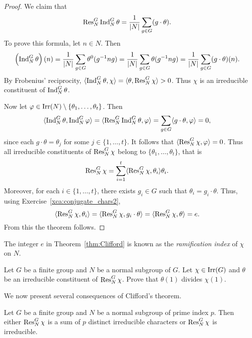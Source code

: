 \begin{proof}
    We claim that 
    \[
    \operatorname{Res}_N^G\operatorname{Ind}_N^G\theta=\frac{1}{|N|}\sum_{g\in G}(g\cdot\theta).
    \]
    To prove this formula, let $n\in N$. Then 
    \[
    \left(\operatorname{Ind}_N^G\theta\right)(n)
    =\frac{1}{|N|}\sum_{g\in G}\theta^0(g^{-1}ng)
    =\frac{1}{|N|}\sum_{g\in G}\theta(g^{-1}ng)
    =\frac{1}{|N|}\sum_{g\in G}(g\cdot\theta)(n).
    \]
    By Frobenius' reciprocity, 
    $\langle\operatorname{Ind}_N^G\theta,\chi\rangle=\langle\theta,\operatorname{Res}_N^G\chi\rangle>0$. 
    Thus $\chi$ is an irreducible constituent of $\operatorname{Ind}_N^G\theta$. 
    
    Now 
    let $\varphi\in\operatorname{Irr}(N)\setminus\{\theta_1,\dots,\theta_t\}$. Then
    \[
    \langle \operatorname{Ind}_N^G\theta, \operatorname{Ind}_N^G\varphi\rangle
    =\langle \operatorname{Res}_N^G\operatorname{Ind}_N^G\theta,\varphi\rangle
    =\sum_{g\in G}\langle g\cdot\theta,\varphi\rangle=0,
    \]
    since each $g\cdot\theta=\theta_j$ for some $j\in\{1,\dots,t\}$. 
    It follows that $\langle\operatorname{Res}_N^G\chi,\varphi\rangle=0$. 
    Thus all irreducible constituents of $\operatorname{Res}_N^G\chi$ belong
    to $\{\theta_1,\dots,\theta_t\}$, that is
    \[
\operatorname{Res}_N^G\chi=\sum_{i=1}^t\langle\operatorname{Res}_N^G\chi,\theta_i\rangle\theta_i.
    \]
    Moreover, for each $i\in\{1,\dots,t\}$, 
    there exists $g_i\in G$ such that
    $\theta_i=g_i\cdot\theta$. Thus, using Exercise~\ref{xca:conjugate_chars2}, 
    \[
    \langle\operatorname{Res}_N^G\chi,\theta_i\rangle=\langle\operatorname{Res}_N^G\chi,g_i\cdot\theta\rangle=\langle\operatorname{Res}_N^G\chi,\theta\rangle=e.\]
    From this the theorem follows. 
\end{proof}

The integer $e$ in Theorem~\ref{thm:Clifford} is known as the \emph{ramification index} of $\chi$ on $N$.

\begin{exercise}
\label{xca:Clifford_divisibility}
    Let $G$ be a finite group and $N$ be a normal subgroup of $G$. Let $\chi\in\operatorname{Irr}(G)$ and $\theta$ 
    be an irreducible constituent of $\operatorname{Res}_N^G\chi$. 
    Prove that $\theta(1)$ divides $\chi(1)$. 
\end{exercise}

We now present several consequences of Clifford’s theorem.

\begin{theorem}
    Let $G$ be a finite group and $N$ be a normal subgroup of prime index $p$. Then either $\operatorname{Res}_N^G\chi$ is a sum of $p$ 
    distinct irreducible characters or $\operatorname{Res}_N^G\chi$ is irreducible. 
\end{theorem}

